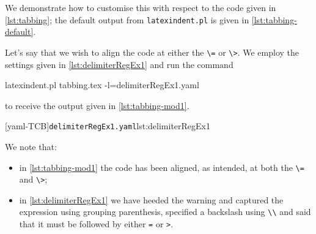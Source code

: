  \begin{example}
 We demonstrate how to customise this with respect to the code given in
 \cref{lst:tabbing}; the default output from \lstinline!latexindent.pl! is given in
 \cref{lst:tabbing-default}.

 \begin{cmhtcbraster}
 \end{cmhtcbraster}

 Let's say that we wish to align the code at either the \lstinline!\=! or \lstinline!\>!.
 We employ the settings given in \cref{lst:delimiterRegEx1} and run the command

 \begin{commandshell}
latexindent.pl tabbing.tex -l=delimiterRegEx1.yaml
\end{commandshell}

 to receive the output given in \cref{lst:tabbing-mod1}. 

 \begin{cmhtcbraster}
  [yaml-TCB]{\texttt{delimiterRegEx1.yaml}}{lst:delimiterRegEx1}
 \end{cmhtcbraster}
 We note that:
 \begin{itemize}
  \item in \cref{lst:tabbing-mod1} the code has been aligned, as intended, at both the
        \lstinline!\=! and \lstinline!\>!;
  \item in \cref{lst:delimiterRegEx1} we have heeded the warning and captured the expression
        using grouping parenthesis, specified a backslash using \lstinline!\\! and said that it
        must be followed by either \lstinline!=! or \lstinline!>!.
 \end{itemize}
 \end{example}

